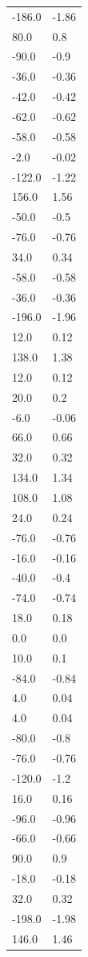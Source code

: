 \begin{longtable}{ll}
-186.0 & -1.86 \\
80.0 & 0.8 \\
-90.0 & -0.9 \\
-36.0 & -0.36 \\
-42.0 & -0.42 \\
-62.0 & -0.62 \\
-58.0 & -0.58 \\
-2.0 & -0.02 \\
-122.0 & -1.22 \\
156.0 & 1.56 \\
-50.0 & -0.5 \\
-76.0 & -0.76 \\
34.0 & 0.34 \\
-58.0 & -0.58 \\
-36.0 & -0.36 \\
-196.0 & -1.96 \\
12.0 & 0.12 \\
138.0 & 1.38 \\
12.0 & 0.12 \\
20.0 & 0.2 \\
-6.0 & -0.06 \\
66.0 & 0.66 \\
32.0 & 0.32 \\
134.0 & 1.34 \\
108.0 & 1.08 \\
24.0 & 0.24 \\
-76.0 & -0.76 \\
-16.0 & -0.16 \\
-40.0 & -0.4 \\
-74.0 & -0.74 \\
18.0 & 0.18 \\
0.0 & 0.0 \\
10.0 & 0.1 \\
-84.0 & -0.84 \\
4.0 & 0.04 \\
4.0 & 0.04 \\
-80.0 & -0.8 \\
-76.0 & -0.76 \\
-120.0 & -1.2 \\
16.0 & 0.16 \\
-96.0 & -0.96 \\
-66.0 & -0.66 \\
90.0 & 0.9 \\
-18.0 & -0.18 \\
32.0 & 0.32 \\
-198.0 & -1.98 \\
146.0 & 1.46 \\

\end{longtable}
